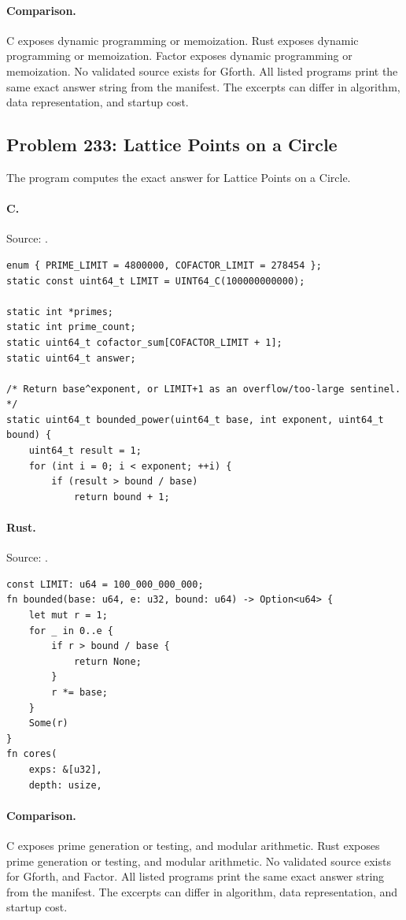 \paragraph{Comparison.}
C exposes dynamic programming or memoization. Rust exposes dynamic programming or memoization. Factor exposes dynamic programming or memoization.
No validated source exists for Gforth.
All listed programs print the same exact answer string from the manifest. The excerpts can differ in algorithm, data representation, and startup cost.

\subsection{Problem 233: Lattice Points on a Circle}
\label{walkthrough:p233}
The program computes the exact answer for Lattice Points on a Circle.

\paragraph{C.} Source: .
\begin{lstlisting}
enum { PRIME_LIMIT = 4800000, COFACTOR_LIMIT = 278454 };
static const uint64_t LIMIT = UINT64_C(100000000000);

static int *primes;
static int prime_count;
static uint64_t cofactor_sum[COFACTOR_LIMIT + 1];
static uint64_t answer;

/* Return base^exponent, or LIMIT+1 as an overflow/too-large sentinel. */
static uint64_t bounded_power(uint64_t base, int exponent, uint64_t bound) {
    uint64_t result = 1;
    for (int i = 0; i < exponent; ++i) {
        if (result > bound / base)
            return bound + 1;
\end{lstlisting}

\paragraph{Rust.} Source: .
\begin{lstlisting}
const LIMIT: u64 = 100_000_000_000;
fn bounded(base: u64, e: u32, bound: u64) -> Option<u64> {
    let mut r = 1;
    for _ in 0..e {
        if r > bound / base {
            return None;
        }
        r *= base;
    }
    Some(r)
}
fn cores(
    exps: &[u32],
    depth: usize,
\end{lstlisting}

\paragraph{Comparison.}
C exposes prime generation or testing, and modular arithmetic. Rust exposes prime generation or testing, and modular arithmetic.
No validated source exists for Gforth, and Factor.
All listed programs print the same exact answer string from the manifest. The excerpts can differ in algorithm, data representation, and startup cost.

